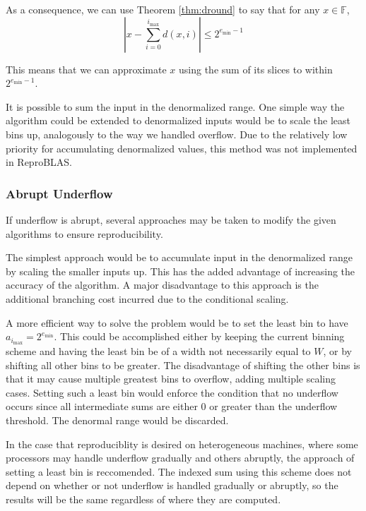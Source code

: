 \documentclass[12pt]{article}
\providecommand{\F}{\ensuremath{\mathbb{F}}}
\providecommand{\min}{\ensuremath{\text{min}}}
\providecommand{\max}{\ensuremath{\text{max}}}
\theoremstyle{definition}
\numberwithin{equation}{section}
\numberwithin{figure}{section}
\begin{document}
      As a consequence, we can use Theorem \ref{thm:dround} to say that for any $x \in \F$,
      \begin{equation}
        |x - \sum\limits_{i = 0}^{i_{\max}} d(x, i)| \leq 2^{e_{\min} - 1}
        \label{eq:droundunderflow}
      \end{equation}

      This means that we can approximate $x$ using the sum of its slices to within $2^{e_{\min} - 1}$.

      It is possible to sum the input in the denormalized range. One simple way the algorithm could be extended to denormalized inputs would be to scale the least bins up, analogously to the way we handled overflow. Due to the relatively low priority for accumulating denormalized values, this method was not implemented in ReproBLAS.

    \subsubsection{Abrupt Underflow}
      \label{sec:indexed_underflow_abrupt}
      If underflow is abrupt, several approaches may be taken to modify the given algorithms to ensure reproducibility.

      The simplest approach would be to accumulate input in the denormalized range by scaling the smaller inputs up. This has the added advantage of increasing the accuracy of the algorithm. A major disadvantage to this approach is the additional branching cost incurred due to the conditional scaling.

      A more efficient way to solve the problem would be to set the least bin to have $a_{i_{\max}} = 2^{e_{\min}}$. This could be accomplished either by keeping the current binning scheme and having the least bin be of a width not necessarily equal to $W$, or by shifting all other bins to be greater. The disadvantage of shifting the other bins is that it may cause multiple greatest bins to overflow, adding multiple scaling cases. Setting such a least bin would enforce the condition that no underflow occurs since all intermediate sums are either $0$ or greater than the underflow threshold. The denormal range would be discarded.

    In the case that reproduciblity is desired on heterogeneous machines, where some processors may handle underflow gradually and others abruptly, the approach of setting a least bin is reccomended. The indexed sum using this scheme does not depend on whether or not underflow is handled gradually or abruptly, so the results will be the same regardless of where they are computed.
\end{document}
